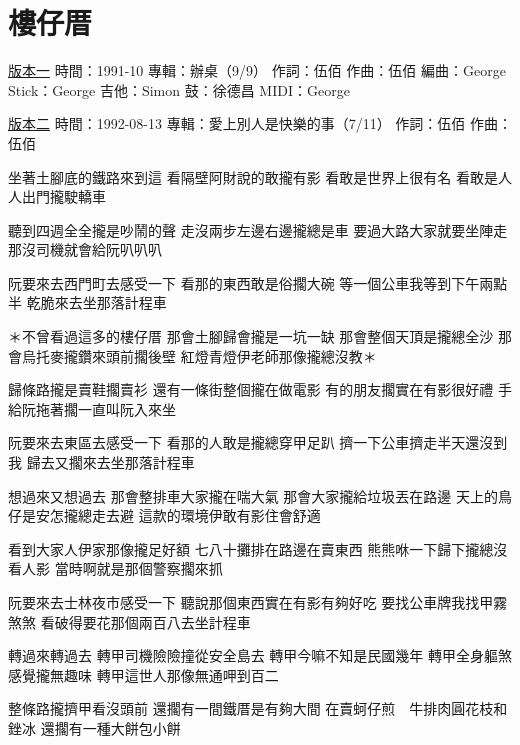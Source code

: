 \documentclass[UTF8,a4paper,oneside,twocolumn,12pt]{ctexbook}
\newcommand{\infopair}[2]{\textbullet #1：#2}
\newcommand{\zc}[1][伍佰]{\infopair{作詞}{#1}}
\newcommand{\zq}[1][伍佰]{\infopair{作曲}{#1}}
\newcommand{\bq}[1][伍佰]{\infopair{編曲}{#1}}
\newcommand{\zj}[1]{\infopair{專輯}{#1}}
\newcommand{\sj}[1]{\infopair{時間}{#1}}
\newenvironment{info}{\begin{flushleft}\kaishu
	}
	{\end{flushleft}\normalsize\yahei\par}
\newenvironment{lyric}{
	}
{}
\begin{document}
\section{樓仔厝}
\begin{info}
	\underline{版本一}
	\sj{1991-10}
	\zj{辦桌（9/9）}
	\zc
	\zq
	\bq[George]
	\infopair{Stick}{George}
	\infopair{吉他}{Simon}
	\infopair{鼓}{徐德昌}
	\infopair{MIDI}{George}
\end{info}
\begin{info}
	\underline{版本二}
	\sj{1992-08-13}
	\zj{愛上別人是快樂的事（7/11）}
	\zc
	\zq
\end{info}
\begin{lyric}
	坐著土腳底的鐵路來到這
	看隔壁阿財說的敢攏有影
	看敢是世界上很有名
	看敢是人人出門攏駛轎車

	聽到四週全全攏是吵鬧的聲
	走沒兩步左邊右邊攏總是車
	要過大路大家就要坐陣走
	那沒司機就會給阮叭叭叭

	阮要來去西門町去感受一下
	看那的東西敢是俗擱大碗
	等一個公車我等到下午兩點半
	乾脆來去坐那落計程車

	＊不曾看過這多的樓仔厝
	那會土腳歸會攏是一坑一缺
	那會整個天頂是攏總全沙
	那會烏托麥攏鑽來頭前擱後壁
	紅燈青燈伊老師那像攏總沒教＊

	歸條路攏是賣鞋擱賣衫
	還有一條街整個攏在做電影
	有的朋友擱實在有影很好禮
	手給阮拖著擱一直叫阮入來坐

	阮要來去東區去感受一下
	看那的人敢是攏總穿甲足趴
	擠一下公車擠走半天還沒到我
	歸去又擱來去坐那落計程車

	想過來又想過去
	那會整排車大家攏在喘大氣
	那會大家攏給垃圾丟在路邊
	天上的鳥仔是安怎攏總走去避
	這款的環境伊敢有影住會舒適

	看到大家人伊家那像攏足好額
	七八十攤排在路邊在賣東西
	熊熊咻一下歸下攏總沒看人影
	當時啊就是那個警察擱來抓

	阮要來去士林夜市感受一下
	聽說那個東西實在有影有夠好吃
	要找公車牌我找甲霧煞煞
	看破得要花那個兩百八去坐計程車

	轉過來轉過去
	轉甲司機險險撞從安全島去
	轉甲今嘛不知是民國幾年
	轉甲全身軀煞感覺攏無趣味
	轉甲這世人那像無通呷到百二

	整條路攏擠甲看沒頭前
	還擱有一間鐵厝是有夠大間
	在賣蚵仔煎　牛排肉圓花枝和銼冰
	還擱有一種大餅包小餅
\end{lyric}
\end{document}
